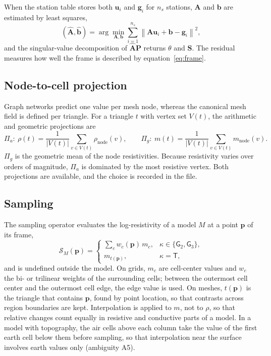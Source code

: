 \documentclass[manuscript]{geophysics}
\newcommand{\Gtwo}{\mathsf{G}_{2}}
\newcommand{\Gthree}{\mathsf{G}_{3}}
\newcommand{\Mtri}{\mathsf{T}}
\begin{document}
When the station table stores both $\mathbf{u}_i$ and $\mathbf{g}_i$
for $n_s$ stations, $\mathbf{A}$ and $\mathbf{b}$ are estimated by least
squares,
\begin{equation}
(\hat{\mathbf{A}}, \hat{\mathbf{b}}) = \arg\min_{\mathbf{A}, \mathbf{b}}
\sum_{i=1}^{n_s} \left\lVert \mathbf{A}\mathbf{u}_i + \mathbf{b} - \mathbf{g}_i \right\rVert^2 ,
\label{eq:register}
\end{equation}
and the singular-value decomposition of $\hat{\mathbf{A}}\mathbf{P}$
returns $\theta$ and $\mathbf{S}$. The residual measures how well the
frame is described by equation~\ref{eq:frame}.

\subsection{Node-to-cell projection}

Graph networks predict one value per mesh node, whereas the canonical
mesh field is defined per triangle. For a triangle $t$ with vertex set
$V(t)$, the arithmetic and geometric projections are
\begin{equation}
\Pi_a:\ \rho(t) = \frac{1}{|V(t)|}\sum_{v \in V(t)} \rho_{\mathrm{node}}(v),
\qquad
\Pi_g:\ m(t) = \frac{1}{|V(t)|}\sum_{v \in V(t)} m_{\mathrm{node}}(v).
\label{eq:node}
\end{equation}
$\Pi_g$ is the geometric mean of the node resistivities. Because
resistivity varies over orders of magnitude, $\Pi_a$ is dominated by
the most resistive vertex. Both projections are available, and the
choice is recorded in the file.

\subsection{Sampling}

The sampling operator evaluates the log-resistivity of a model $M$ at
a point $\mathbf{p}$ of its frame,
\begin{equation}
\mathcal{S}_M(\mathbf{p}) =
\begin{cases}
\displaystyle\sum_{c} w_c(\mathbf{p})\, m_c, & \kappa \in \{\Gtwo, \Gthree\},\\[6pt]
m_{t(\mathbf{p})}, & \kappa = \Mtri,
\end{cases}
\label{eq:sample}
\end{equation}
and is undefined outside the model. On grids, $m_c$ are cell-center
values and $w_c$ the bi- or trilinear weights of the surrounding
cells; between the outermost cell center and the outermost cell edge,
the edge value is used. On meshes, $t(\mathbf{p})$ is the triangle
that contains $\mathbf{p}$, found by point location, so that contrasts
across region boundaries are kept. Interpolation is applied to $m$,
not to $\rho$, so that relative changes count equally in resistive
and conductive parts of a model. In a model with topography, the air cells above
each column take the value of the first earth cell below them before
sampling, so that interpolation near the surface involves earth values
only (ambiguity A5).
\end{document}
